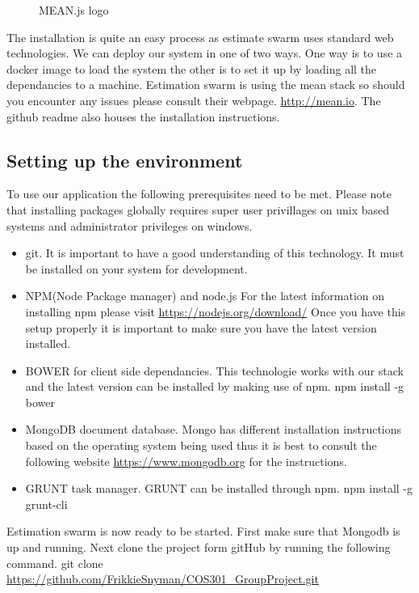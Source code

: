 \begin{figure}[H]
	    	\centering
	    	\caption{MEAN.js logo}
	    	\label{fig:MEAN}
   	\end{figure}
The installation is quite an easy process as estimate swarm uses standard web technologies. We can deploy our system in one of two ways. One way is to use a docker image to load the system the other is to set it up by loading all the dependancies to a machine. Estimation swarm is using the mean stack so should you encounter any issues please consult their webpage. \url{http://mean.io}. The github readme also houses the installation instructions.
\subsection{Setting up the environment}
To use our application the following prerequisites need to be met. Please note that installing packages globally requires super user privillages on unix based systems and administrator privileges on windows.
\begin{itemize}
	\item git. It is important to have a good understanding of this technology. It must be installed on your system for development.
	\item NPM(Node Package manager) and node.js
	For the latest information on installing npm please visit \url{https://nodejs.org/download/} Once you have this setup properly it is important to make sure you have the latest version installed.
	\item BOWER for client side dependancies.
	This technologie works with our stack and the latest version can be installed by making use of npm.
	\newline
	npm install -g bower
	\item MongoDB document database. Mongo has different installation instructions based on the operating system being used thus it is best to consult the following website \url{https://www.mongodb.org} for the instructions.
	\item GRUNT task manager. GRUNT can be installed through npm. 
	\newline
	npm install -g grunt-cli
\end{itemize}
Estimation swarm is now ready to be started. First make sure that Mongodb is up and running. Next clone the project form gitHub by running the following command.
\newline
git clone \url{https://github.com/FrikkieSnyman/COS301_GroupProject.git}
